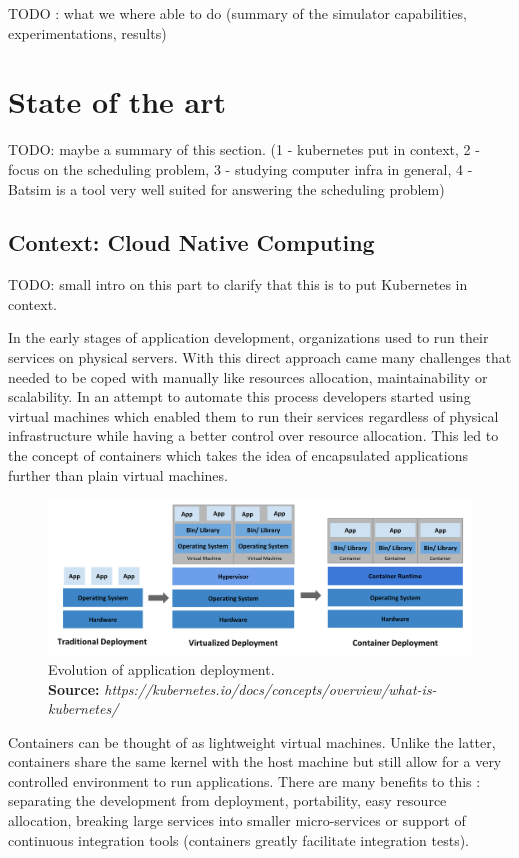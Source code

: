 \documentclass[12pt, a4paper]{memoir}
\newcommand*{\captionsource}[2]{%
    \caption[{#1}]{%
        #1%
        \\\hspace{\linewidth}%
	\textbf{Source:} \textit{#2}%
    }%
}
\begin{document}
TODO : what we where able to do (summary of the simulator capabilities,
experimentations, results)

\chapter{State of the art}

TODO: maybe a summary of this section. (1 - kubernetes put in context, 2 -
focus on the scheduling problem, 3 - studying computer infra in general, 4 -
Batsim is a tool very well suited for answering the scheduling problem)

\section{Context: Cloud Native Computing}

TODO: small intro on this part to clarify that this is to put Kubernetes in context.

In the early stages of application development, organizations used to run their
services on physical servers. With this direct approach came many challenges
that needed to be coped with manually like resources allocation,
maintainability or scalability. In an attempt to automate this process
developers started using virtual machines which enabled them to run their
services regardless of physical infrastructure while having a better control
over resource allocation.  This led to the concept of containers which takes
the idea of encapsulated applications further than plain virtual machines.

\begin{figure}[h]
	\centering
	\includegraphics[width=\textwidth]{./imgs/container_evolution.png}
	\captionsource{Evolution of application deployment.}{https://kubernetes.io/docs/concepts/overview/what-is-kubernetes/}
	\label{fig:container-evolution}
\end{figure}

Containers can be thought of as lightweight virtual machines. Unlike the
latter, containers share the same kernel with the host machine but still allow
for a very controlled environment to run applications. There are many
benefits to this : separating the development from deployment, portability,
easy resource allocation, breaking large services into smaller micro-services
or support of continuous integration tools (containers greatly facilitate
integration tests).\\
\end{document}
